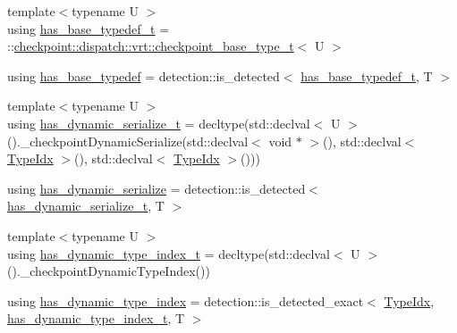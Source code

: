 \begin{DoxyCompactItemize}
\item 
{\footnotesize template$<$typename U $>$ }\\using \hyperlink{structcheckpoint_1_1dispatch_1_1vrt_1_1_virtual_serialize_traits_a900e9fcb655c36ab48fd6db0f0258b75}{has\+\_\+base\+\_\+typedef\+\_\+t} = \+::\hyperlink{namespacecheckpoint_1_1dispatch_1_1vrt_a41abdf16741a7c58e926d9813985bd2f}{checkpoint\+::dispatch\+::vrt\+::checkpoint\+\_\+base\+\_\+type\+\_\+t}$<$ U $>$
\item 
using \hyperlink{structcheckpoint_1_1dispatch_1_1vrt_1_1_virtual_serialize_traits_a5ef65f047ffa20ed206485238ceb2af5}{has\+\_\+base\+\_\+typedef} = detection\+::is\+\_\+detected$<$ \hyperlink{structcheckpoint_1_1dispatch_1_1vrt_1_1_virtual_serialize_traits_a900e9fcb655c36ab48fd6db0f0258b75}{has\+\_\+base\+\_\+typedef\+\_\+t}, T $>$
\item 
{\footnotesize template$<$typename U $>$ }\\using \hyperlink{structcheckpoint_1_1dispatch_1_1vrt_1_1_virtual_serialize_traits_a5b78afee2cf468bf3fedddb017c9aad0}{has\+\_\+dynamic\+\_\+serialize\+\_\+t} = decltype(std\+::declval$<$ U $>$().\+\_\+checkpoint\+Dynamic\+Serialize(std\+::declval$<$ void $\ast$ $>$(), std\+::declval$<$ \hyperlink{namespacecheckpoint_1_1dispatch_1_1vrt_acd3f9e6b091bcfbc23dc35ea8ef45d3b}{Type\+Idx} $>$(), std\+::declval$<$ \hyperlink{namespacecheckpoint_1_1dispatch_1_1vrt_acd3f9e6b091bcfbc23dc35ea8ef45d3b}{Type\+Idx} $>$()))
\item 
using \hyperlink{structcheckpoint_1_1dispatch_1_1vrt_1_1_virtual_serialize_traits_a716daac95820b854a4f7dc6ae1eb8d2f}{has\+\_\+dynamic\+\_\+serialize} = detection\+::is\+\_\+detected$<$ \hyperlink{structcheckpoint_1_1dispatch_1_1vrt_1_1_virtual_serialize_traits_a5b78afee2cf468bf3fedddb017c9aad0}{has\+\_\+dynamic\+\_\+serialize\+\_\+t}, T $>$
\item 
{\footnotesize template$<$typename U $>$ }\\using \hyperlink{structcheckpoint_1_1dispatch_1_1vrt_1_1_virtual_serialize_traits_a6a4e72c1d80374001f122c17ac1cc0e8}{has\+\_\+dynamic\+\_\+type\+\_\+index\+\_\+t} = decltype(std\+::declval$<$ U $>$().\+\_\+checkpoint\+Dynamic\+Type\+Index())
\item 
using \hyperlink{structcheckpoint_1_1dispatch_1_1vrt_1_1_virtual_serialize_traits_a5eb693a371780ee8f5e81a825e62bd5d}{has\+\_\+dynamic\+\_\+type\+\_\+index} = detection\+::is\+\_\+detected\+\_\+exact$<$ \hyperlink{namespacecheckpoint_1_1dispatch_1_1vrt_acd3f9e6b091bcfbc23dc35ea8ef45d3b}{Type\+Idx}, \hyperlink{structcheckpoint_1_1dispatch_1_1vrt_1_1_virtual_serialize_traits_a6a4e72c1d80374001f122c17ac1cc0e8}{has\+\_\+dynamic\+\_\+type\+\_\+index\+\_\+t}, T $>$
\end{DoxyCompactItemize}
